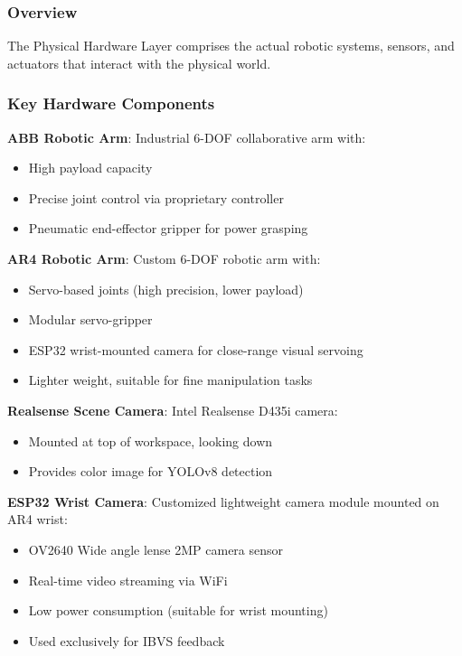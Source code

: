 \subsubsection{Overview}
The Physical Hardware Layer comprises the actual robotic systems, sensors, and actuators that interact with the physical world.

\subsubsection{Key Hardware Components}

\textbf{ABB Robotic Arm}: Industrial 6-DOF collaborative arm with:
\begin{itemize}
    \item High payload capacity
    \item Precise joint control via proprietary controller
    \item Pneumatic end-effector gripper for power grasping
\end{itemize}

\textbf{AR4 Robotic Arm}: Custom 6-DOF robotic arm with:
\begin{itemize}
    \item Servo-based joints (high precision, lower payload)
    \item Modular servo-gripper
    \item ESP32 wrist-mounted camera for close-range visual servoing
    \item Lighter weight, suitable for fine manipulation tasks
\end{itemize}

\textbf{Realsense Scene Camera}: Intel Realsense D435i camera:
\begin{itemize}
    \item Mounted at top of workspace, looking down
    \item Provides color image for YOLOv8 detection
\end{itemize}

\textbf{ESP32 Wrist Camera}: Customized lightweight camera module mounted on AR4 wrist:
\begin{itemize}
    \item OV2640 Wide angle lense 2MP camera sensor
    \item Real-time video streaming via WiFi
    \item Low power consumption (suitable for wrist mounting)
    \item Used exclusively for IBVS feedback 
\end{itemize}

